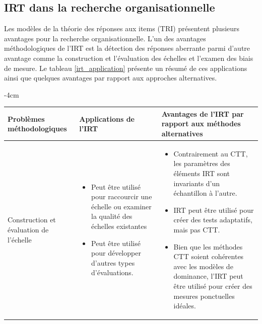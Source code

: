 \subsection{IRT dans la recherche organisationnelle}
Les modèles de la théorie des réponses aux items (TRI) présentent plusieurs avantages pour la recherche organisationnelle. L’un des avantages méthodologiques de l’IRT est la détection des réponses aberrante parmi d’autre avantage comme la construction et l’évaluation des échelles et l’examen des biais de mesure. Le tableau \ref{irt_application} présente un résumé de ces applications ainsi que quelques avantages par rapport aux approches alternatives.
\begin{table}[H]
	\centering
	\addtolength{\leftskip} {-4cm}
	\addtolength{\rightskip}{-4.5cm}
	\begin{tabular}{|m{4cm}|m{6cm}|m{6cm}|}
	\hline
	\textbf{Problèmes méthodologiques} & \textbf{Applications de l'IRT} & \textbf{Avantages de l'IRT par rapport aux méthodes alternatives}  \\ \hline
	Construction et évaluation de l'échelle 
	 & 
	\begin{itemize}[leftmargin=*]
	    \item Peut être utilisé pour raccourcir une échelle ou examiner la qualité des échelles existantes
	    \item Peut être utilisé pour développer d'autres types d'évaluations.
	\end{itemize}
	& 
	\begin{itemize}[leftmargin=*]
		\item Contrairement au CTT, les paramètres des éléments IRT sont invariants d'un échantillon à l'autre.
		\item IRT peut être utilisé pour créer des tests adaptatifs, mais pas CTT.
		\item Bien que les méthodes CTT soient cohérentes avec les modèles de dominance, l'IRT peut être utilisé pour créer des mesures ponctuelles idéales.
	\end{itemize} \\ \hline


\end{tabular}
\end{table}
